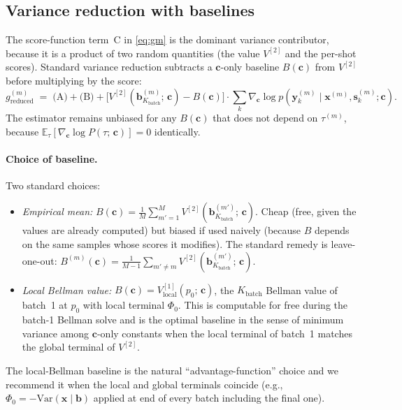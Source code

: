 \documentclass[11pt,a4paper]{article}
\newcommand{\bc}{\bm{c}}
\newcommand{\bx}{\bm{x}}
\newcommand{\by}{\bm{y}}
\newcommand{\bs}{\bm{s}}
\newcommand{\bb}{\bm{b}}
\newcommand{\E}{\mathbb{E}}
\begin{document}
\subsection{Variance reduction with baselines}
\label{sec:baseline}

The score-function term~C in \eqref{eq:gm} is the dominant variance contributor, because
it is a product of two random quantities (the value $V^{[2]}$ and the per-shot scores).
Standard variance reduction subtracts a $\bc$-only baseline $B(\bc)$ from $V^{[2]}$ before
multiplying by the score:
\begin{equation}
g^{(m)}_{\mathrm{reduced}}
\;=\;
\text{(A)} + \text{(B)} + \bigl[V^{[2]}(\bb_{K_\mathrm{batch}}^{(m)};\, \bc) - B(\bc)\bigr] \cdot \sum_k \nabla_{\bc} \log p(\by_k^{(m)} \mid \bx^{(m)}, \bs_k^{(m)}; \bc).
\label{eq:gm_baseline}
\end{equation}
The estimator remains unbiased for any $B(\bc)$ that does not depend on $\tau^{(m)}$,
because $\E_{\tau}[\nabla_{\bc} \log P(\tau;\, \bc)] = 0$ identically.

\paragraph{Choice of baseline.}  Two standard choices:
\begin{itemize}[nosep, leftmargin=2em]
\item \emph{Empirical mean:} $B(\bc) = \frac{1}{M} \sum_{m'=1}^M V^{[2]}(\bb_{K_\mathrm{batch}}^{(m')};\, \bc)$.
      Cheap (free, given the values are already computed) but biased if used naively
      (because $B$ depends on the same samples whose scores it modifies).  The standard
      remedy is leave-one-out: $B^{(m)}(\bc) = \frac{1}{M-1} \sum_{m' \ne m} V^{[2]}(\bb_{K_\mathrm{batch}}^{(m')};\, \bc)$.
\item \emph{Local Bellman value:} $B(\bc) = V^{[1]}_{\mathrm{local}}(p_0;\, \bc)$, the
      $K_\mathrm{batch}$ Bellman value of batch~1 at $p_0$ with local terminal $\Phi_0$.
      This is computable for free during the batch-1 Bellman solve and is the optimal
      baseline in the sense of minimum variance among $\bc$-only constants when the local
      terminal of batch~1 matches the global terminal of $V^{[2]}$.
\end{itemize}

The local-Bellman baseline is the natural ``advantage-function'' choice and we recommend
it when the local and global terminals coincide (e.g., $\Phi_0 = -\mathrm{Var}(\bx \mid \bb)$
applied at end of every batch including the final one).
\end{document}
